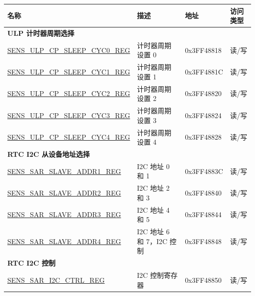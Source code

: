 \begin{longtable}{ | p{6cm} | p{5.5cm} | p{2cm} | p{1.5cm} | }
    \hline\rowcolor{lightgray}
    名称 & 描述 &  地址 & 访问类型 \\ \hline
    \multicolumn{4}{|l|}{\textbf{ULP 计时器周期选择}} \\ \hline
    \hyperref[regdesc:SENSULPCPSLEEPCYCnREG]{SENS\_ULP\_CP\_SLEEP\_CYC0\_REG} & 计时器周期设置 0 & 0x3FF48818 & 读/写 \\ \hline
    \hyperref[regdesc:SENSULPCPSLEEPCYCnREG]{SENS\_ULP\_CP\_SLEEP\_CYC1\_REG} & 计时器周期设置 1 & 0x3FF4881C & 读/写\\ \hline
    \hyperref[regdesc:SENSULPCPSLEEPCYCnREG]{SENS\_ULP\_CP\_SLEEP\_CYC2\_REG} & 计时器周期设置 2 & 0x3FF48820 & 读/写\\ \hline
    \hyperref[regdesc:SENSULPCPSLEEPCYCnREG]{SENS\_ULP\_CP\_SLEEP\_CYC3\_REG} & 计时器周期设置 3 & 0x3FF48824 & 读/写\\ \hline
    \hyperref[regdesc:SENSULPCPSLEEPCYCnREG]{SENS\_ULP\_CP\_SLEEP\_CYC4\_REG} & 计时器周期设置 4 & 0x3FF48828 & 读/写\\ \hline
    \multicolumn{4}{|l|}{\textbf{RTC I2C 从设备地址选择}} \\ \hline
    \hyperref[regdesc:SENSSARSLAVEADDR1REG]{SENS\_SAR\_SLAVE\_ADDR1\_REG} & I2C 地址 0 和 1 & 0x3FF4883C & 读/写\\ \hline
    \hyperref[regdesc:SENSSARSLAVEADDR2REG]{SENS\_SAR\_SLAVE\_ADDR2\_REG} & I2C 地址 2 和 3 & 0x3FF48840 & 读/写\\ \hline
    \hyperref[regdesc:SENSSARSLAVEADDR3REG]{SENS\_SAR\_SLAVE\_ADDR3\_REG} & I2C 地址 4 和 5 & 0x3FF48844 & 读/写\\ \hline
    \hyperref[regdesc:SENSSARSLAVEADDR4REG]{SENS\_SAR\_SLAVE\_ADDR4\_REG} & I2C 地址 6 和 7，I2C 控制 & 0x3FF48848 & 读/写\\ \hline
    \multicolumn{4}{|l|}{\textbf{RTC I2C 控制}} \\ \hline
    \hyperref[regdesc:SENSSARI2CCTRLREG]{SENS\_SAR\_I2C\_CTRL\_REG} & I2C 控制寄存器 & 0x3FF48850 & 读/写\\ \hline
    \end{longtable}
